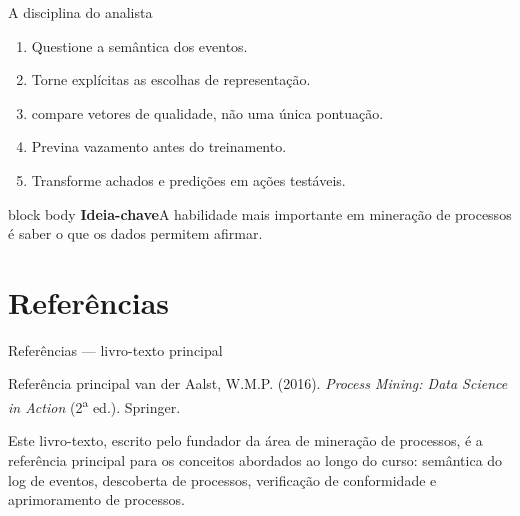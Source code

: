 \documentclass[aspectratio=169,11pt]{beamer}
\newcommand{\coursename}{Mineração de Processos}
\newcommand{\instructor}{Sylvio Barbon Junior}
\newcommand{\keyidea}[1]{%
  \begin{beamercolorbox}[rounded=true,sep=0.65em]{block body}
    \textbf{\color{Teal}Ideia-chave}\quad #1
  \end{beamercolorbox}
}
\begin{document}
\begin{frame}{A disciplina do analista}
  \Large
  \begin{enumerate}
    \item Questione a semântica dos eventos.
    \item Torne explícitas as escolhas de representação.
    \item compare vetores de qualidade, não uma única pontuação.
    \item Previna vazamento antes do treinamento.
    \item Transforme achados e predições em ações testáveis.
  \end{enumerate}
  \vspace{0.35cm}
  \keyidea{A habilidade mais importante em mineração de processos é saber o que os dados permitem afirmar.}
\end{frame}

\begin{frame}[plain]
\end{frame}

\section{Referências}

\begin{frame}{Referências — livro-texto principal}
  \begin{block}{Referência principal}
    van der Aalst, W.M.P. (2016). \textit{Process Mining: Data Science in
    Action} (2\textsuperscript{a} ed.). Springer.
  \end{block}
  \vspace{0.4cm}
  Este livro-texto, escrito pelo fundador da área de mineração de
  processos, é a referência principal para os conceitos abordados ao
  longo do curso: semântica do log de eventos, descoberta de processos,
  verificação de conformidade e aprimoramento de processos.
\end{frame}
\end{document}
